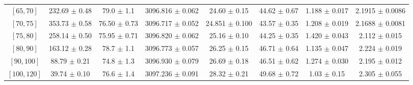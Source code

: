 \begin{tabular}{c||c|c|c|c|c|c|c}
$[65, 70]$ & 232.69 $\pm$ 0.48 & 79.0 $\pm$ 1.1 & 3096.816 $\pm$ 0.062 & 24.60 $\pm$ 0.15 & 44.62 $\pm$ 0.67 & 1.188 $\pm$ 0.017 & 2.1915 $\pm$ 0.0086\\
$[70, 75]$ & 353.73 $\pm$ 0.58 & 76.50 $\pm$ 0.73 & 3096.717 $\pm$ 0.052 & 24.851 $\pm$ 0.100 & 43.57 $\pm$ 0.35 & 1.208 $\pm$ 0.019 & 2.1688 $\pm$ 0.0081\\
$[75, 80]$ & 258.14 $\pm$ 0.50 & 75.95 $\pm$ 0.71 & 3096.820 $\pm$ 0.062 & 25.16 $\pm$ 0.10 & 44.25 $\pm$ 0.35 & 1.420 $\pm$ 0.043 & 2.112 $\pm$ 0.015\\
$[80, 90]$ & 163.12 $\pm$ 0.28 & 78.7 $\pm$ 1.1 & 3096.773 $\pm$ 0.057 & 26.25 $\pm$ 0.15 & 46.71 $\pm$ 0.64 & 1.135 $\pm$ 0.047 & 2.224 $\pm$ 0.019\\
$[90, 100]$ & 88.79 $\pm$ 0.21 & 74.8 $\pm$ 1.3 & 3096.930 $\pm$ 0.079 & 26.69 $\pm$ 0.18 & 46.51 $\pm$ 0.62 & 1.274 $\pm$ 0.030 & 2.195 $\pm$ 0.012\\
$[100, 120]$ & 39.74 $\pm$ 0.10 & 76.6 $\pm$ 1.4 & 3097.236 $\pm$ 0.091 & 28.32 $\pm$ 0.21 & 49.68 $\pm$ 0.72 & 1.03 $\pm$ 0.15 & 2.305 $\pm$ 0.055\\
\end{tabular}
